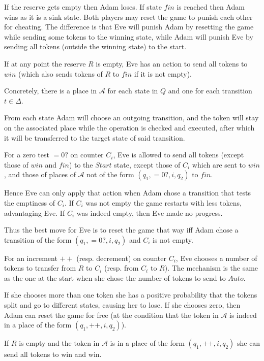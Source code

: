 \documentclass{article}
\begin{document}
	If the reserve gets empty then Adam loses. If state $fin$ is reached then Adam wins as it is a sink state. Both players may reset the game to punish each other for cheating. The difference is that Eve will punish Adam by resetting the game while sending some tokens to the winning state, while Adam will punish Eve by sending all tokens (outside the winning state) to the start.
	
	If at any point the reserve $R$ is empty, Eve has an action to send all tokens to $win$ (which also sends tokens of $R$ to $fin$ if it is not empty).
	
	Concretely, there is a place in $\mathcal{A}$ for each state in $Q$ and one for each transition $t \in \Delta$.
	
	From each state Adam will choose an outgoing transition, and the token will stay on the associated place while the operation is checked and executed, after which it will be transferred to the target state of said transition.
	
	For a zero test $=0?$ on counter $C_i$, Eve is allowed to send all tokens (except those of $win$ and $fin$) to the $Start$ state, except those of $C_i$ which are sent to $win$, and those of places of $\mathcal{A}$ not of the form $(q_1, =0?, i, q_2)$ to $fin$.
	
	Hence Eve can only apply that action when Adam chose a transition that tests the emptiness of $C_i$. If $C_i$ was not empty the game restarts with less tokens, advantaging Eve. 
	If $C_i$ was indeed empty, then Eve made no progress.
	
	Thus the best move for Eve is to reset the game that way iff Adam chose a transition of the form $(q_1, =0?, i, q_2)$ and $C_i$ is not empty. 
	
	For an increment $++$ (resp. decrement) on counter $C_i$, Eve chooses a number of tokens to transfer from $R$ to $C_i$ (resp. from $C_i$ to $R$). The mechanism is the same as the one at the start when she chose the number of tokens to send to $Auto$.
	
	If she chooses more than one token she has a positive probability that the tokens split and go to different states, causing her to lose. If she chooses zero, then Adam can reset the game for free (at the condition that the token in $\mathcal{A}$ is indeed in a place of the form $(q_1, ++, i, q_2)$).
	
	If $R$ is empty and the token in $\mathcal{A}$ is in a place of the form $(q_1, ++, i, q_2)$ she can send all tokens to win and win.
	
\end{document}
